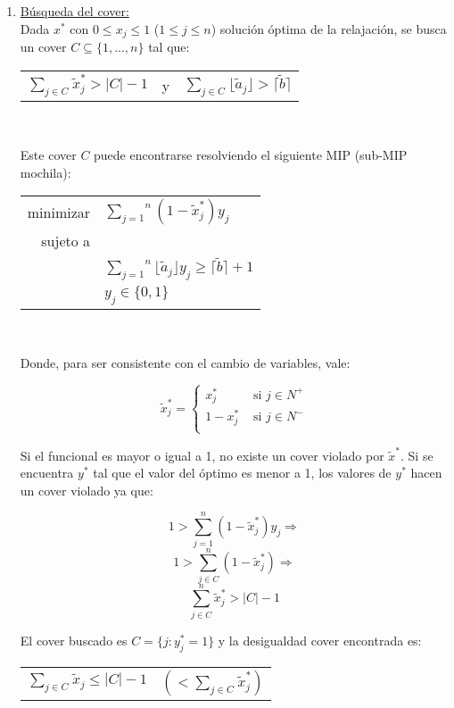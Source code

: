 \begin{enumerate}[ 1{)} ]
\item \underline{Búsqueda del cover:}\\
Dada $x^*$ con $0\leq x_j \leq 1$ ($1\leq j \leq n$) solución óptima de la relajación, se busca un cover $C\subseteq \{1,...,n\}$ tal que:

{
\centering
\begin{tabular}{ccc}
$\overset{}{\underset{j \in C}{\sum}} \tilde{x}^*_j > |C|-1$ & y & $\overset{}{\underset{j \in C}{\sum}} \lfloor \tilde{a}_j \rfloor > \lceil \tilde{b} \rceil$\\
\end{tabular}\\
\vspace{5mm}
}

Este cover $C$ puede encontrarse resolviendo el siguiente MIP (sub-MIP mochila):

{
\centering
\begin{tabular}{rl}
minimizar & $\overset{n}{\underset{j=1}{\sum}} (1 - \tilde{x}^*_j) y_j$\\
sujeto a&\\
&$\overset{n}{\underset{j=1}{\sum}} \lfloor \tilde{a}_j \rfloor y_j \geq \lceil \tilde{b} \rceil + 1$\\
&$y_j \in \{0,1\}$\\
\end{tabular}\\
\vspace{5mm}
}

Donde, para ser consistente con el cambio de variables, vale:

$$\tilde{x}^*_j = 
\begin{cases}
x^*_j & \text{ si } j \in N^+\\
1-x^*_j & \text{ si } j \in N^-\\
\end{cases}$$

Si el funcional es mayor o igual a 1, no existe un cover violado por $\tilde{x}^*$. Si se encuentra $y^*$ tal que el valor del óptimo es menor a 1, los valores de $y^*$ hacen un cover violado ya que:

$$1 > \overset{n}{\underset{j=1}{\sum}} (1 - \tilde{x}^*_j) y_j \Rightarrow$$
$$1 > \overset{n}{\underset{j\in C}{\sum}} (1-\tilde{x}^*_j) \Rightarrow$$
$$\overset{n}{\underset{j\in C}{\sum}} \tilde{x}^*_j > |C| - 1$$

El cover buscado es $C=\{j: y^*_j = 1\}$ y la desigualdad cover encontrada es:

{
\centering
\begin{tabular}{cc}
$\overset{}{\underset{j \in C}{\sum}} \tilde{x}_j \leq |C|-1$ & $(< \overset{}{\underset{j \in C}{\sum}} \tilde{x}^*_j)$\\
\end{tabular}\\
\vspace{5mm}
}


\end{enumerate}
